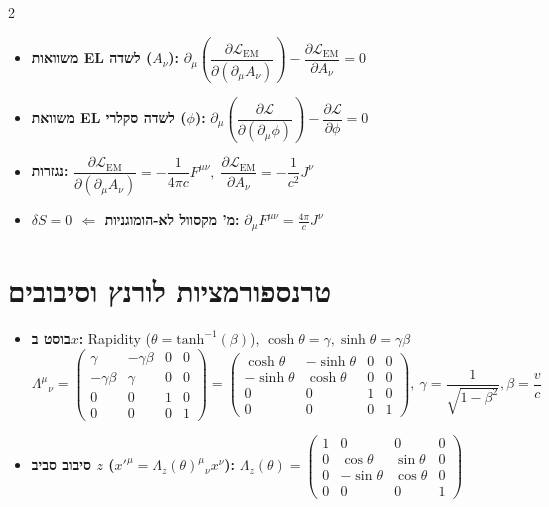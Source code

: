 \documentclass[10pt,a4paper]{article}
\begin{document}
\begin{multicols*}{2}
\begin{itemize}
    \item \textbf{משוואות \textenglish{EL} לשדה ($A_\nu$):}
    $
    \partial_\mu \left( \dfrac{\partial \mathcal{L}_{\text{EM}}}{\partial (\partial_\mu A_\nu)} \right) - \dfrac{\partial \mathcal{L}_{\text{EM}}}{\partial A_\nu} = 0
    $

    \item \textbf{משוואת \textenglish{EL} לשדה סקלרי ($\phi$):}
$
\partial_\mu \left( \dfrac{\partial \mathcal{L}}{\partial (\partial_\mu \phi)} \right) - \dfrac{\partial \mathcal{L}}{\partial \phi} = 0
$

    \item \textbf{נגזרות:}
    $
    \dfrac{\partial \mathcal{L}_{\text{EM}}}{\partial (\partial_\mu A_\nu)} = -\dfrac{1}{4\pi c} F^{\mu\nu}, \; \dfrac{\partial \mathcal{L}_{\text{EM}}}{\partial A_\nu} = -\dfrac{1}{c^2} J^\nu
    $

    \item \textbf{$\delta S = 0$ $\Leftarrow$ מ' מקסוול לא-הומוגניות:}
    $
    \partial_\mu F^{\mu\nu} = \frac{4\pi}{c} J^\nu
    $
\end{itemize}

\section{טרנספורמציות לורנץ וסיבובים}
\begin{itemize}
    \item \textbf{בוסט ב$x$:} \textenglish{Rapidity} ($\theta=\text{tanh}^{-1}(\beta)$), $\cosh\theta=\gamma, \sinh\theta=\gamma\beta$
    {\scriptsize
    \setlength{\arraycolsep}{2.5pt}
    \[
    \Lambda^\mu{}_\nu = \begin{pmatrix}
    \gamma & -\gamma\beta & 0 & 0 \\
    -\gamma\beta & \gamma & 0 & 0 \\
    0 & 0 & 1 & 0 \\
    0 & 0 & 0 & 1
    \end{pmatrix} = \begin{pmatrix}
    \cosh\theta & -\sinh\theta & 0 & 0 \\
    -\sinh\theta & \cosh\theta & 0 & 0 \\
    0 & 0 & 1 & 0 \\
    0 & 0 & 0 & 1
    \end{pmatrix}, \ \gamma=\frac{1}{\sqrt{1-\beta^2}}
    , \beta=\frac{v}{c}\]
    }
    \item \textbf{סיבוב סביב $z$ ($x'^\mu = \Lambda_z(\theta)^\mu{}_\nu x^\nu$):}
    {\scriptsize
    \setlength{\arraycolsep}{2.5pt}
    $
    \Lambda_z(\theta) = \begin{pmatrix}
    1 & 0 & 0 & 0 \\
    0 & \cos\theta & \sin\theta & 0 \\
    0 & -\sin\theta & \cos\theta & 0 \\
    0 & 0 & 0 & 1
    \end{pmatrix}
    $
    }
\end{itemize}


\end{multicols*}
\end{document}

